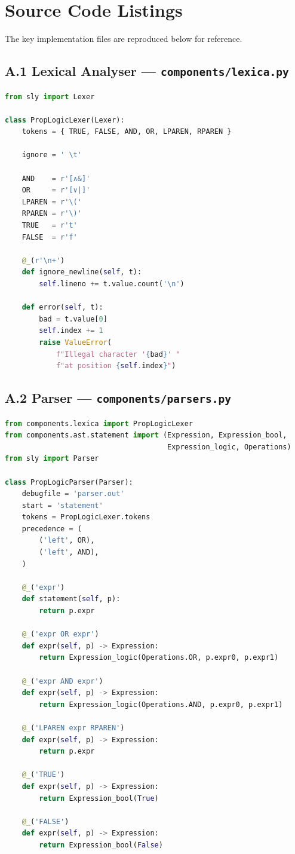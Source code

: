 \section*{Source Code Listings}

The key implementation files are reproduced below for reference.

\subsection*{A.1 Lexical Analyser --- \texttt{components/lexica.py}}

\begin{lstlisting}[language=Python]
from sly import Lexer

class PropLogicLexer(Lexer):
    tokens = { TRUE, FALSE, AND, OR, LPAREN, RPAREN }

    ignore = ' \t'

    AND    = r'[∧&]'
    OR     = r'[∨|]'
    LPAREN = r'\('
    RPAREN = r'\)'
    TRUE   = r't'
    FALSE  = r'f'

    @_(r'\n+')
    def ignore_newline(self, t):
        self.lineno += t.value.count('\n')

    def error(self, t):
        bad = t.value[0]
        self.index += 1
        raise ValueError(
            f"Illegal character '{bad}' "
            f"at position {self.index}")
\end{lstlisting}

\subsection*{A.2 Parser --- \texttt{components/parsers.py}}

\begin{lstlisting}[language=Python]
from components.lexica import PropLogicLexer
from components.ast.statement import (Expression, Expression_bool,
                                      Expression_logic, Operations)
from sly import Parser

class PropLogicParser(Parser):
    debugfile = 'parser.out'
    start = 'statement'
    tokens = PropLogicLexer.tokens
    precedence = (
        ('left', OR),
        ('left', AND),
    )

    @_('expr')
    def statement(self, p):
        return p.expr

    @_('expr OR expr')
    def expr(self, p) -> Expression:
        return Expression_logic(Operations.OR, p.expr0, p.expr1)

    @_('expr AND expr')
    def expr(self, p) -> Expression:
        return Expression_logic(Operations.AND, p.expr0, p.expr1)

    @_('LPAREN expr RPAREN')
    def expr(self, p) -> Expression:
        return p.expr

    @_('TRUE')
    def expr(self, p) -> Expression:
        return Expression_bool(True)

    @_('FALSE')
    def expr(self, p) -> Expression:
        return Expression_bool(False)
\end{lstlisting}

